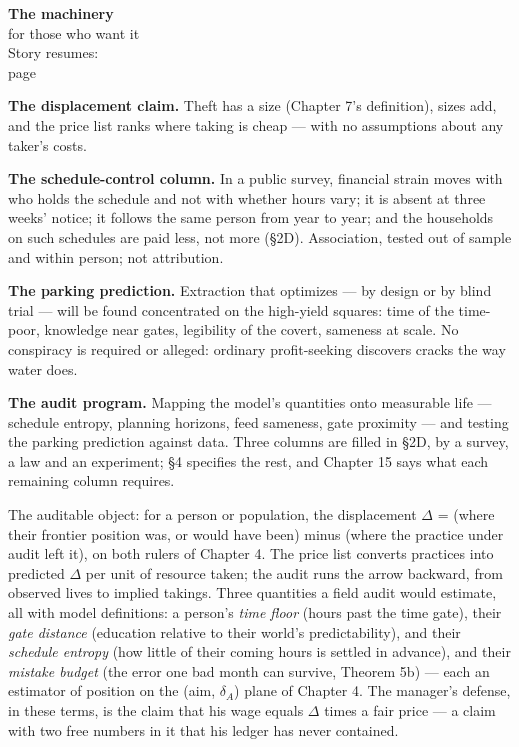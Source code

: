 \begin{machinery}{\textbf{The machinery}\\for those who want it\\[3pt]{\color{muted}Story resumes:\\page~\pageref{ch14}}}


\textbf{The displacement claim.}  Theft has a size
(Chapter 7's definition), sizes add, and the price list ranks where
taking is cheap --- with no assumptions about any taker's costs.

\textbf{The schedule-control column.}  In a public
survey, financial strain moves with who holds the schedule and not with
whether hours vary; it is absent at three weeks' notice; it follows the
same person from year to year; and the households on such schedules
are paid less, not more (§2D). Association, tested out of sample
and within person; not attribution.

\textbf{The parking prediction.}  Extraction that
optimizes --- by design or by blind trial --- will be found concentrated
on the high-yield squares: time of the time-poor, knowledge near
gates, legibility of the covert, sameness at scale. No conspiracy is
required or alleged: ordinary profit-seeking discovers cracks the way
water does.

\textbf{The audit program.}  Mapping the model's quantities onto
measurable life --- schedule entropy, planning horizons, feed sameness,
gate proximity --- and testing the parking prediction against data.
Three columns are filled in §2D, by a survey, a law and an experiment;
§4 specifies the rest, and Chapter 15 says what each remaining column
requires.


The auditable object: for a person or population, the displacement
\(\Delta\) = (where their frontier position was, or would have been) minus
(where the practice under audit left it), on both rulers of
Chapter 4. The price list converts practices into predicted \(\Delta\) per
unit of resource taken; the audit runs the arrow backward, from
observed lives to implied takings. Three quantities a field audit
would estimate, all with model definitions: a person's \emph{time floor}
(hours past the time gate), their \emph{gate distance} (education relative
to their world's predictability), and their \emph{schedule entropy} (how
little of their coming hours is settled in advance), and their \emph{mistake budget}
(the error one bad month can survive, Theorem 5b) --- each an estimator
of position on the (aim, \(\delta_A\)) plane of Chapter 4. The manager's defense, in
these terms, is the claim that his wage equals \(\Delta\) times a fair price ---
a claim with two free numbers in it that his ledger has never
contained.


\end{machinery}
